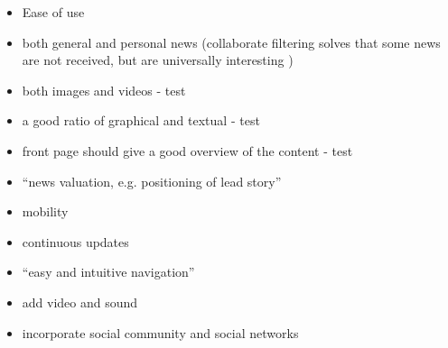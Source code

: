 \begin{itemize}
	\item Ease of use
	\item both general and personal news (collaborate filtering solves that some news are not received, but are universally interesting \cite{fulltext.pdf})
	
	\item both images and videos - test
	\item a good ratio of graphical and textual - test
	
	\item front page should give a good overview of the content - test
	\item ``news valuation, e.g. positioning of lead story'' \cite[p. 7]{FULLTEXT01.pdf}
	\item  mobility \cite[p. 7]{FULLTEXT01.pdf}
	\item  continuous updates \cite[p. 7]{FULLTEXT01.pdf}
	\item ``easy and intuitive navigation'' \cite[p. 7]{FULLTEXT01.pdf}
	\item add video and sound \cite[p. 7]{FULLTEXT01.pdf}
	\item incorporate social community and social networks
\end{itemize}

